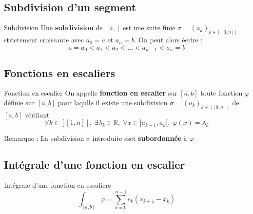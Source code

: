 \subsection{Subdivision d'un segment} %
\label{sub:Subdivision d'un segment}

\begin{Definition}[colbacktitle=red!75!black]{Subdivision}{}
  Une \textbf{subdivision} de $[a,]$ est une suite finie $\sigma = (a_k) _{k \in [\![0,n]\!]}$ strictement croissante avec $a_0 = a$ et $a_n = b$. On peut alors écrire :
  \begin{equation}
    a = a_0 < a_1 < a_2 < \dots <a _{n-1} < a_n = b
  \end{equation}
\end{Definition}





\subsection{Fonctions en escaliers} %
\label{sub:Fonctions en escaliers}

\begin{Definition}[colbacktitle=red!75!black]{Fonction en escalier}{}
  On appelle \textbf{fonction en escalier} sur $[a,b]$ toute fonction $\varphi$ définie sur $[a,b]$ pour laqulle il existe une subdivision $\sigma = (a_k) _{k \in [\![0, n]\!]}$ de $[a,b]$ vérifiant 
  \begin{equation}
    \forall k\in [\![1, n]\!],\; \exists \lambda_k \in \mathbb{R},\; \forall x\in ]a _{k-1}, a_k[, \; \varphi(x) = \lambda_k
  \end{equation}
\end{Definition}

Remarque : La subdivision $\sigma$ introduite eset \textbf{subordonnée} à $\varphi$




\subsection{Intégrale d'une fonction en escalier} %
\label{sub:Intégrale d'une fonction en escalier}

\begin{Definition}[colbacktitle=red!75!black]{Intégrale d'une fonction en escaliers}{}
\begin{equation}
  \int_{[a,b]}^{} \varphi = \sum_{k=0}^{n-1} c_k (x _{k+1} - x_k)
\end{equation}
\end{Definition}

